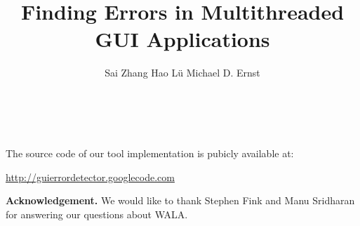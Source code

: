 \documentclass{sig-alternate}
\begin{document}
\title{Finding Errors in Multithreaded GUI Applications}


\author{
\alignauthor Sai Zhang \quad Hao L\"u \quad Michael D. Ernst\\
       \\
       \\
}


\maketitle
















\vspace{1mm}

\noindent The source code of our tool implementation is pubicly available at:


\noindent \url{http://guierrordetector.googlecode.com}


\vspace{2mm}

\noindent \textbf{Acknowledgement.} We would like
to thank Stephen Fink and Manu Sridharan for
answering our questions about WALA.
\vspace{-2mm}


\small{

}
\end{document}

